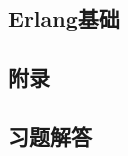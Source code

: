 \documentclass[preview,multi,crop=false,border=1in,class=memoir]{standalone}
\begin{document}
\begin{preview-page}
\maketitle
\tableofcontents*
\end{preview-page}

\begin{preview-page}
\part{Erlang基础}
\end{preview-page}




\appendix

\begin{preview-page}
\part{附录}
\end{preview-page}

\begin{preview-page}
\chapter{习题解答}
\shipoutAnswer
\end{preview-page}
\end{document}
